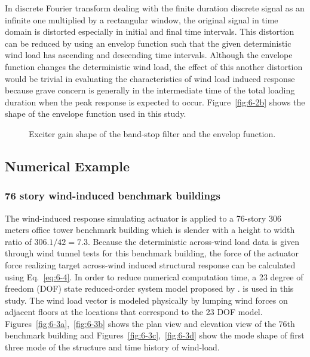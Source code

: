 In discrete Fourier transform dealing with the finite duration discrete signal as an infinite one multiplied by a rectangular window, the original signal in time domain is distorted especially in initial and final time intervals. This distortion can be reduced by using an envelop function such that the given deterministic wind load has ascending and descending time intervals. Although the envelope function changes the deterministic wind load, the effect of this another distortion would be trivial in evaluating the characteristics of wind load induced response because grave concern is generally in the intermediate time of the total loading duration when the peak response is expected to occur. Figure~\ref{fig:6-2b} shows the shape of the envelope function used in this study.

\begin{figure}[!ht]
\centering
{}
\caption{Exciter gain shape of the band-stop filter and the envelop function.}
\label{fig:6-2}
\end{figure}

\subsection{Numerical Example}
\subsubsection{76 story wind-induced benchmark buildings}

The wind-induced response simulating actuator is applied to a 76-story 306 meters office tower benchmark building which is slender with a height to width ratio of $306.1/42= 7.3$. Because the deterministic across-wind load data is given through wind tunnel tests for this benchmark building, the force of the actuator force realizing target across-wind induced structural response can be calculated using Eq.~\eqref{eq:6-4}. In order to reduce numerical computation time, a 23 degree of freedom (DOF) state reduced-order system model proposed by \citet{yang2004benchmark}. is used in this study. The wind load vector is modeled physically by lumping wind forces on adjacent floors at the locations that correspond to the 23 DOF model. Figures~\ref{fig:6-3a},~\ref{fig:6-3b} shows the plan view and elevation view of the 76th benchmark building and Figures~\ref{fig:6-3c},~\ref{fig:6-3d} show the mode shape of first three mode of the structure and time history of wind-load.

